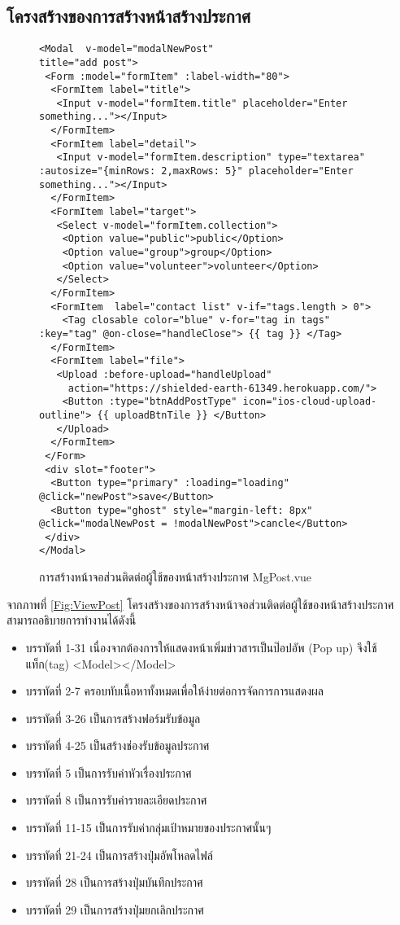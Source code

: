 		\subsection{โครงสร้างของการสร้างหน้าสร้างประกาศ}
		\begin{figure}[H]
			{\begin{lstlisting}
<Modal  v-model="modalNewPost"
title="add post">
 <Form :model="formItem" :label-width="80">
  <FormItem label="title">
   <Input v-model="formItem.title" placeholder="Enter something..."></Input>
  </FormItem>
  <FormItem label="detail">
   <Input v-model="formItem.description" type="textarea" :autosize="{minRows: 2,maxRows: 5}" placeholder="Enter something..."></Input>
  </FormItem>
  <FormItem label="target">
   <Select v-model="formItem.collection">
    <Option value="public">public</Option>
    <Option value="group">group</Option>
    <Option value="volunteer">volunteer</Option>
   </Select>
  </FormItem>
  <FormItem  label="contact list" v-if="tags.length > 0">
    <Tag closable color="blue" v-for="tag in tags" :key="tag" @on-close="handleClose"> {{ tag }} </Tag>
  </FormItem>
  <FormItem label="file">
   <Upload :before-upload="handleUpload"
     action="https://shielded-earth-61349.herokuapp.com/">
    <Button :type="btnAddPostType" icon="ios-cloud-upload-outline"> {{ uploadBtnTile }} </Button>
   </Upload>
  </FormItem>
 </Form>
 <div slot="footer">
  <Button type="primary" :loading="loading" @click="newPost">save</Button>
  <Button type="ghost" style="margin-left: 8px" @click="modalNewPost = !modalNewPost">cancle</Button>
 </div>
</Modal>
				\end{lstlisting}}
			\caption{การสร้างหน้าจอส่วนติดต่อผู้ใช้ของหน้าสร้างประกาศ MgPost.vue}
			\label{Fig:MgPost}
		\end{figure}
		จากภาพที่ \ref{Fig:ViewPost} โครงสร้างของการสร้างหน้าจอส่วนติดต่อผู้ใช้ของหน้าสร้างประกาศ สามารถอธิบายการทำงานได้ดังนี้
		\begin{itemize}[label={--}]
			\item บรรทัดที่ 1-31  เนื่องจากต้องการให้แสดงหน้าเพิ่มข่าวสารเป็นป๊อปอัพ (Pop up)  จึงใช้แท็ก(tag) <Model></Model>
			\item บรรทัดที่ 2-7	 ครอบทับเนื้อหาทั้งหมดเพื่อให้ง่ายต่อการจัดการการแสดงผล
			\item บรรทัดที่ 3-26 เป็นการสร้างฟอร์มรับข้อมูล
			\item บรรทัดที่ 4-25 เป็นสร้างช่องรับข้อมูลประกาศ
			\item บรรทัดที่ 5 เป็นการรับค่าหัวเรื่องประกาศ
			\item บรรทัดที่ 8 เป็นการรับค่ารายละเอียดประกาศ
			\item บรรทัดที่ 11-15 เป็นการรับค่ากลุ่มเป้าหมายของประกาศนั้นๆ
			\item บรรทัดที่ 21-24 เป็นการสร้างปุ่มอัพโหลดไฟล์
			\item บรรทัดที่ 28 เป็นการสร้างปุ่มบันทึกประกาศ
			\item บรรทัดที่ 29 เป็นการสร้างปุ่มยกเลิกประกาศ
		\end{itemize}
